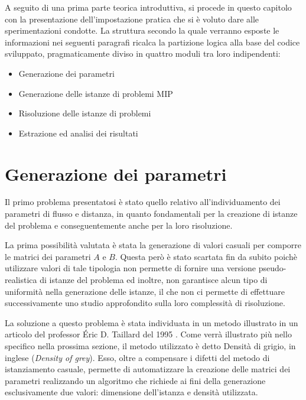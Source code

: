 A seguito di una prima parte teorica introduttiva, si procede in questo capitolo con la presentazione 
dell'impostazione pratica che si è voluto dare alle sperimentazioni condotte. La struttura secondo la quale verranno esposte 
le informazioni nei seguenti paragrafi ricalca la partizione logica alla base del codice sviluppato, pragmaticamente diviso 
in quattro moduli tra loro indipendenti:
\begin{itemize}
    \item Generazione dei parametri
    \item Generazione delle istanze di problemi MIP
    \item Risoluzione delle istanze di problemi
    \item Estrazione ed analisi dei risultati
\end{itemize}




\section{Generazione dei parametri}
Il primo problema presentatosi è stato quello relativo all'individuamento dei parametri di flusso e distanza, in quanto 
fondamentali per la creazione di istanze del problema e conseguentemente anche per la loro risoluzione.

La prima possibilità valutata è stata la generazione di valori casuali per comporre le matrici dei parametri $A$ e $B$. 
Questa però è stato scartata fin da subito poichè utilizzare valori di tale tipologia non permette di fornire una versione 
pseudo-realistica di istanze del problema ed inoltre, non garantisce alcun tipo di uniformità nella generazione delle istanze, 
il che non ci permette di effettuare successivamente uno studio approfondito sulla loro complessità di risoluzione.

La soluzione a questo problema è stata individuata in un metodo illustrato in un articolo del professor Éric D. Taillard del 1995
\cite{TAILLARD}. Come verrà illustrato più nello specifico nella prossima sezione, il metodo utilizzato è detto Densità di
grigio, in inglese (\textit{Density of grey}). Esso, oltre a compensare i difetti del metodo di istanziamento casuale, permette
di automatizzare la creazione delle matrici dei parametri realizzando un algoritmo che richiede ai fini della generazione 
esclusivamente due valori: dimensione dell'istanza e densità utilizzata.

